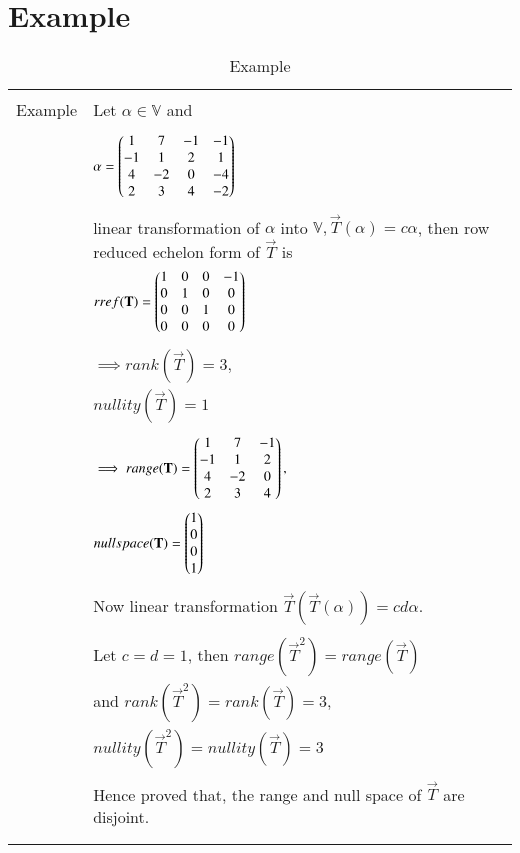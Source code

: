 \documentclass[journal,12pt]{IEEEtran}
\begin{document}
\section{\textbf{Example}}
\renewcommand{\thetable}{2}
\begin{longtable}{|l|l|}
\hline
\multirow{3}{*}{Example} & \\
& Let $\alpha \in \mathbb{V}$ and\\
& \\
& $\alpha = \begin{pmatrix}1&7&-1&-1\\-1&1&2&1\\4&-2&0&-4\\2&3&4&-2\end{pmatrix}$\\
& \\
& linear transformation of $\alpha$ into $\mathbb{V}, \vec{T}(\alpha) = c\alpha$, then row reduced echelon form of $\vec{T}$ is\\
& $rref(\mathbf{T}) = \begin{pmatrix}1&0&0&-1\\0&1&0&0\\0&0&1&0\\0&0&0&0\end{pmatrix}$\\
& \\
& $\implies rank(\vec{T}) = 3,$\\
& $nullity(\vec{T}) = 1$\\
& \\
& $\implies range(\mathbf{T}) = \begin{pmatrix}1&7&-1\\-1&1&2\\4&-2&0\\2&3&4\end{pmatrix},$\\
& $null space(\mathbf{T}) = \begin{pmatrix}1\\0\\0\\1\end{pmatrix}$\\
& \\
& Now linear transformation $\vec{T}(\vec{T}(\alpha)) = cd\alpha$.\\
& \\
& Let $ c = d = 1$, then $range(\vec{T}^2) = range (\vec{T})$\\
& and $rank (\vec{T}^2) = rank (\vec{T}) = 3$,\\
& $nullity (\vec{T}^2) = nullity (\vec{T}) = 3$\\
& \\
& Hence proved that, the range and null space of $\vec{T}$ are disjoint.\\
& \\
\hline
\caption{Example}
\label{table:2}
\end{longtable}
\end{document}

